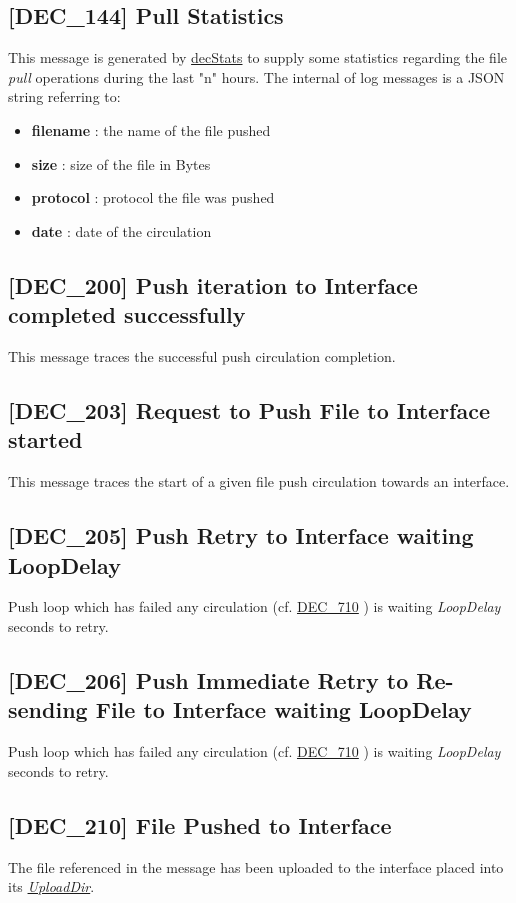 \documentclass[dec_sum_main.tex]{subfiles}
\begin{document}
\subsection{[DEC\_144] Pull Statistics}
This message is generated by \hyperref[decStats]{decStats} to supply some statistics regarding the file \textit{pull} operations during the last "n" hours.\newline
The internal of log messages is a JSON string referring to:
\begin{itemize}
	\item \textbf{filename} : the name of the file pushed
	\item \textbf{size} : size of the file in Bytes
	\item \textbf{protocol} : protocol the file was pushed
	\item \textbf{date} : date of the circulation
\end{itemize}

\label{DEC200}
\subsection{[DEC\_200] Push iteration to Interface completed successfully}
This message traces the successful push circulation completion.

\label{DEC203}
\subsection{[DEC\_203] Request to Push File to Interface started}
This message traces the start of a given file push circulation towards an interface.

\label{DEC205}
\subsection{[DEC\_205] Push Retry to Interface waiting LoopDelay}
Push loop which has failed any circulation (cf. \hyperref[DEC710]{DEC\_710} ) is waiting \textit{LoopDelay} seconds to retry.

\label{DEC206}
\subsection{[DEC\_206] Push Immediate Retry to Re-sending File to Interface waiting LoopDelay}
Push loop which has failed any circulation (cf. \hyperref[DEC710]{DEC\_710} ) is waiting \textit{LoopDelay} seconds to retry.


\label{DEC210}
\subsection{[DEC\_210] File Pushed to Interface}
The file referenced in the message has been uploaded to the interface placed into its \hyperref[Upload Rules]{\textit{UploadDir}}.
\end{document}

